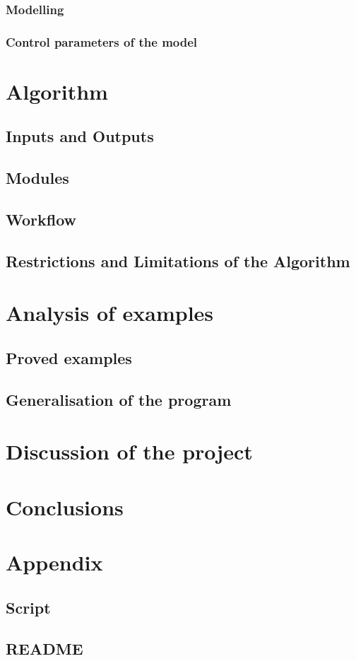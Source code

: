 \documentclass[a4paper,12pt]{report}
\begin{document}
\subsection{Modelling}

\subsection{Control parameters of the model}




\chapter{Algorithm}

\section{Inputs and Outputs}

\section{Modules}

\section{Workflow}

\section{Restrictions and Limitations of the Algorithm}




\chapter{Analysis of examples}

\section{Proved examples}

\section{Generalisation of the program}




\chapter{Discussion of the project}


\chapter{Conclusions}



\chapter{Appendix}

\section{Script}

\section{README}
\end{document}
